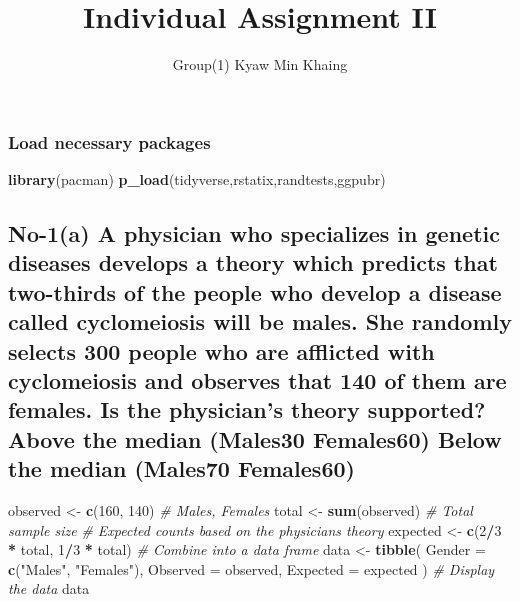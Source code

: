 \documentclass[
]{article}
\title{Individual Assignment II}
\author{Group(1) Kyaw Min Khaing}
\date{}
\newenvironment{Shaded}{\begin{snugshade}}{\end{snugshade}}
\newcommand{\AttributeTok}[1]{\textcolor[rgb]{0.13,0.29,0.53}{#1}}
\newcommand{\CommentTok}[1]{\textcolor[rgb]{0.56,0.35,0.01}{\textit{#1}}}
\newcommand{\DecValTok}[1]{\textcolor[rgb]{0.00,0.00,0.81}{#1}}
\newcommand{\FunctionTok}[1]{\textcolor[rgb]{0.13,0.29,0.53}{\textbf{#1}}}
\newcommand{\NormalTok}[1]{#1}
\newcommand{\OtherTok}[1]{\textcolor[rgb]{0.56,0.35,0.01}{#1}}
\newcommand{\SpecialCharTok}[1]{\textcolor[rgb]{0.81,0.36,0.00}{\textbf{#1}}}
\newcommand{\StringTok}[1]{\textcolor[rgb]{0.31,0.60,0.02}{#1}}
\begin{document}
\maketitle

\subsubsection{Load necessary packages}\label{load-necessary-packages}

\begin{Shaded}
\begin{Highlighting}[]
\FunctionTok{library}\NormalTok{(pacman)}
\FunctionTok{p\_load}\NormalTok{(tidyverse,rstatix,randtests,ggpubr)}
\end{Highlighting}
\end{Shaded}

\subsection{No-1(a) A physician who specializes in genetic diseases
develops a theory which predicts that two-thirds of the people who
develop a disease called cyclomeiosis will be males. She randomly
selects 300 people who are afflicted with cyclomeiosis and observes that
140 of them are females. Is the physician's theory supported? Above the
median (Males30 Females60) Below the median (Males70
Females60)}\label{no-1a-a-physician-who-specializes-in-genetic-diseases-develops-a-theory-which-predicts-that-two-thirds-of-the-people-who-develop-a-disease-called-cyclomeiosis-will-be-males.-she-randomly-selects-300-people-who-are-afflicted-with-cyclomeiosis-and-observes-that-140-of-them-are-females.-is-the-physicians-theory-supported-above-the-median-males30-females60-below-the-median-males70-females60}

\begin{Shaded}
\begin{Highlighting}[]
\NormalTok{observed }\OtherTok{\textless{}{-}} \FunctionTok{c}\NormalTok{(}\DecValTok{160}\NormalTok{, }\DecValTok{140}\NormalTok{)  }\CommentTok{\# Males, Females}
\NormalTok{total }\OtherTok{\textless{}{-}} \FunctionTok{sum}\NormalTok{(observed)  }\CommentTok{\# Total sample size}
\CommentTok{\# Expected counts based on the physician\textquotesingle{}s theory}
\NormalTok{expected }\OtherTok{\textless{}{-}} \FunctionTok{c}\NormalTok{(}\DecValTok{2}\SpecialCharTok{/}\DecValTok{3} \SpecialCharTok{*}\NormalTok{ total, }\DecValTok{1}\SpecialCharTok{/}\DecValTok{3} \SpecialCharTok{*}\NormalTok{ total)}
\CommentTok{\# Combine into a data frame}
\NormalTok{data }\OtherTok{\textless{}{-}} \FunctionTok{tibble}\NormalTok{(}
  \AttributeTok{Gender =} \FunctionTok{c}\NormalTok{(}\StringTok{"Males"}\NormalTok{, }\StringTok{"Females"}\NormalTok{),}
  \AttributeTok{Observed =}\NormalTok{ observed,}
  \AttributeTok{Expected =}\NormalTok{ expected}
\NormalTok{)}
\CommentTok{\# Display the data}
\NormalTok{data}
\end{Highlighting}
\end{Shaded}
\end{document}
